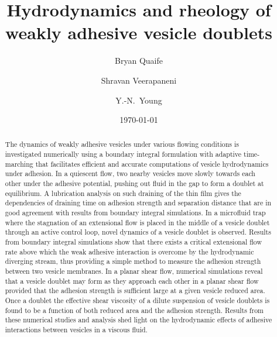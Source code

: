 \documentclass[prf,superscriptaddress,showpacs]{revtex4-1}
\begin{document}

\title{Hydrodynamics and rheology of weakly adhesive vesicle doublets}

\author{Bryan Quaife}
\author{Shravan Veerapaneni}%
%
\author{Y.-N.~Young}%
%

\date{\today}%

\begin{abstract}

The dynamics of weakly adhesive vesicles under various flowing conditions is investigated numerically using a boundary integral formulation with
adaptive time-marching that facilitates efficient and accurate computations of vesicle hydrodynamics under adhesion. In a quiescent flow, two nearby vesicles 
move slowly towards each other under the adhesive potential, pushing out fluid in the gap to  
form a doublet at equilibrium. A lubrication analysis on such draining of the
thin film gives the dependencies of draining time on adhesion strength and separation distance that are in good agreement with results from
boundary integral simulations.
%
In a microfluid trap where the stagnation of an extensional flow  is placed in the middle of a vesicle doublet through an active control loop,
novel dynamics of a vesicle doublet is observed. Results from boundary integral simulations show that there exists a critical extensional flow rate above which the weak adhesive interaction is overcome by the hydrodynamic diverging stream, thus providing a simple method to measure the adhesion strength between two vesicle membranes. 
%
In a planar shear flow, numerical simulations reveal that a vesicle doublet may form as they approach each other in a planar shear flow provided that the adhesion
strength is sufficient large at a given vesicle reduced area. Once a doublet the effective shear viscosity of a dilute suspension of vesicle doublets is found 
to be a function of both reduced area and the adhesion strength.
Results from these numerical studies and analysis shed light on the hydrodynamic effects of adhesive interactions between vesicles in a viscous fluid.
\end{abstract}
\end{document}
